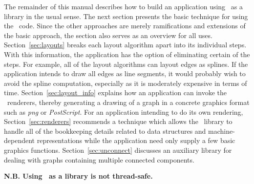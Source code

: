 The remainder of this manual describes how to build an application
using \gviz\ as a library in the usual sense.
The next section presents the basic technique for using the \gviz\ code. Since
the other approaches are merely ramifications and extensions of the
basic approach, the section also serves as an overview for all uses.
Section~\ref{sec:layouts} breaks each layout algorithm apart into 
its individual steps.
With this information, the application has the option of eliminating
certain of the steps. For example, all of the layout algorithms can 
layout edges as splines. If the application intends to draw all edges
as line segments, it would probably wish to avoid the spline computation,
especially as it is moderately expensive in terms of time. 
Section~\ref{sec:layout_info} explains how an application can invoke the
\gviz\ renderers, thereby generating a drawing of a graph in 
a concrete graphics format such as {\em png} or {\em PostScript}.
For an application intending to do its own rendering,
Section~\ref{sec:renderers} recommends a technique which allows the
\gviz\ library to handle all of the bookkeeping details related to
data structures and machine-dependent representations while the
application need only supply a few basic graphics functions.
Section~\ref{sec:unconnect}
discusses an auxiliary library for dealing with graphs containing
multiple connected components.

{\bf N.B. Using \gviz\ as a library is not thread-safe.}

